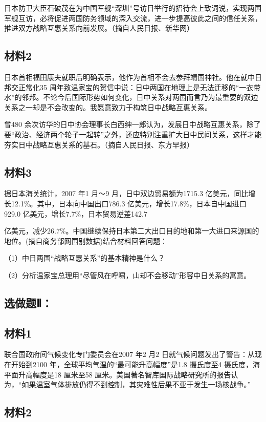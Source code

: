 \documentclass[UTF8,11pt]{ctexart}
\begin{document}
日本防卫大臣石破茂在为中国军舰“深圳”号访日举行的招待会上致词说，实现两国军舰互访，必将促进两国防务领域的深入交流，进一步提高彼此之间的信任关系，推进双方战略互惠关系向前发展。（摘自人民日报、新华网）

\subsection*{材料2}

日本首相福田康夫就职后明确表示，他作为首相不会去参拜靖国神社。他在就中日邦交正常化35 周年致温家宝的贺信中说：日中两国在地理上是无法迁移的“一衣带水”的邻邦。不论今后国际形势如何变化，日中关系对两国而言乃为最重要的双边关系之一却是不会改变的。我愿意致力于构筑日中战略互惠关系。

曾480 余次访华的日中协会理事长白西绅一郎认为，发展日中战略互惠关系，除了要“政治、经济两个轮子一起转”之外，还应特别注重扩大日中民间关系，这样才能夯实日中战略互惠关系的基石。（摘自人民日报、东方早报）

\subsection*{材料3}

据日本海关统计，2007 年1 月～9 月，日中双边贸易额为1715.3 亿美元，同比增长12.1\%。其中，日本向中国出口786.3 亿美元，增长17.8\%，日本自中国进口929.0 亿美元，增长7.7\%，日本贸易逆差142.7


亿美元，减少26.7\%。中国继续保持日本第二大出口目的地和第一大进口来源国的地位。(摘自商务部网国别数据)结合材料回答问题：


（1）中日两国“战略互惠关系”的基本精神是什么？


（2）分析温家宝总理用“尽管风在呼啸，山却不会移动”形容中日关系的寓意。


\subsection*{选做题Ⅱ：}

\subsection*{材料1}

联合国政府间气候变化专门委员会在2007 年2 月2 日就气候问题发出了警告：从现在开始到2100 年，全球平均气温的“最可能升高幅度”是1.8 摄氏度至4 摄氏度，海平面升高幅度是18 厘米至58 厘米。美国著名智库国际战略研究所的报告认为，“如果温室气体排放仍得不到控制，其灾难性后果不亚于发生一场核战争。”


\subsection*{材料2}
\end{document}
